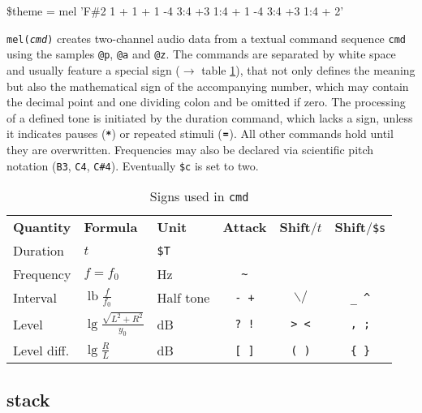 \documentclass[a4paper, 10pt]{article}
\begin{document}
	\begin{center} \ttfamily
		\$theme = mel 'F\#2 1 + 1 + 1 -4 3:4 +3 1:4 + 1 -4 3:4 +3 1:4 + 2'
	\end{center}
	\texttt{mel(\textit{cmd})} creates two-channel audio data from a textual command sequence \texttt{cmd} using the samples \texttt{@p}, \texttt{@a} and \texttt{@z}. The commands are separated by white space and usually feature a special sign ($\rightarrow$ table \ref{signs}), that not only defines the meaning but also the mathematical sign of the accompanying number, which may contain the decimal point and one dividing colon and be omitted if zero. The processing of a defined tone is initiated by the duration command, which lacks a sign, unless it indicates pauses (\texttt{\textbf{*}}) or repeated stimuli ($\texttt{\textbf{=}}$). All other commands hold until they are overwritten. Frequencies may also be declared via scientific pitch notation (\texttt{B3}, \texttt{C4}, \texttt{C\#4}). Eventually \texttt{\$c} is set to two.
	\begin{table}[H]
		\centering
		\begin{tabular}
			{ l            l                                    l            c               c                c }
			{\bf Quantity} & {\bf Formula}                      & {\bf Unit} & {\bf Attack} & {\bf Shift}/$t$ & {\bf Shift}/{\tt \$s} \\
			Duration       & $t$                                & {\tt \$T}  &              &                 &                       \\
			Frequency      & $f = f_0$                          & Hz         & {\tt \~{}}   &                 &                       \\
			Interval       & $\operatorname{lb} \frac f {f_0}$  & Half tone  & {\tt - +}    & $\backslash /$  & {\tt \_ \^{}}         \\
			Level          & $\lg \frac{\sqrt{L^2 + R^2}}{y_0}$ & dB         & {\tt ? !}    & {\tt > <}       & {\tt , ;}             \\
			Level diff.    & $\lg \frac R L$                    & dB         & {\tt [ ]}    & {\tt ( )}       & {\tt \{ \}}
		\end{tabular}
		\caption{Signs used in \texttt{cmd}}
		\label{signs}
	\end{table}

	\subsection{stack}
\end{document}
